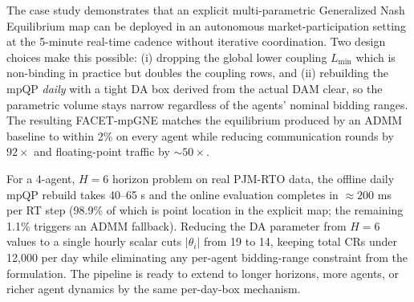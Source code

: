 \documentclass[11pt, letterpaper]{article}
\begin{document}
The case study demonstrates that an explicit multi-parametric Generalized Nash Equilibrium map can be deployed in an autonomous market-participation setting at the 5-minute real-time cadence without iterative coordination. Two design choices make this possible: (i) dropping the global lower coupling $L_{\min}$ which is non-binding in practice but doubles the coupling rows, and (ii) rebuilding the mpQP \emph{daily} with a tight DA box derived from the actual DAM clear, so the parametric volume stays narrow regardless of the agents' nominal bidding ranges. The resulting FACET-mpGNE matches the equilibrium produced by an ADMM baseline to within 2\% on every agent while reducing communication rounds by $92\times$ and floating-point traffic by $\sim 50\times$.

For a 4-agent, $H = 6$ horizon problem on real PJM-RTO data, the offline daily mpQP rebuild takes 40–65 s and the online evaluation completes in $\approx 200$ ms per RT step (98.9\% of which is point location in the explicit map; the remaining 1.1\% triggers an ADMM fallback). Reducing the DA parameter from $H=6$ values to a single hourly scalar cuts $|\theta_i|$ from 19 to 14, keeping total CRs under 12{,}000 per day while eliminating any per-agent bidding-range constraint from the formulation. The pipeline is ready to extend to longer horizons, more agents, or richer agent dynamics by the same per-day-box mechanism.
\end{document}

